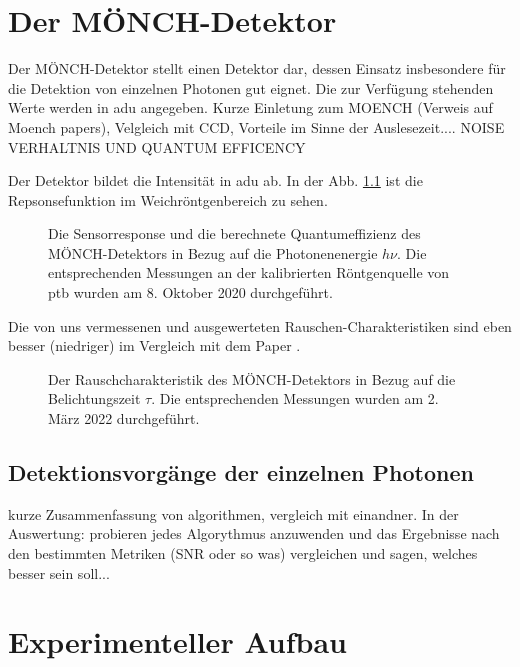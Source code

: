 \chapter{Der MÖNCH-Detektor}
\label{text:moench_theorie}
Der MÖNCH-Detektor stellt einen Detektor dar, dessen Einsatz insbesondere für die Detektion von einzelnen Photonen gut eignet. Die zur Verfügung stehenden Werte werden in \gls{adu} angegeben. \cite{bergamaschi_monch_2018}
Kurze Einletung zum MOENCH (Verweis auf Moench papers), Velgleich mit CCD, Vorteile 
im Sinne der Auslesezeit.... NOISE VERHALTNIS  UND QUANTUM EFFICENCY

Der Detektor bildet die Intensität in \gls{adu} ab. In der Abb. \ref{fig:response_moench} ist die Repsonsefunktion im Weichröntgenbereich zu sehen. 
\begin{figure}[H]
    \centering
    
    \caption{Die Sensorresponse und die berechnete Quantumeffizienz des MÖNCH-Detektors in Bezug auf die Photonenenergie $h\nu$. Die entsprechenden Messungen an der kalibrierten Röntgenquelle von \gls{ptb} wurden am 8. Oktober 2020 durchgeführt.}
    \label{fig:response_moench}
\end{figure}
Die von uns vermessenen und ausgewerteten Rauschen-Charakteristiken sind eben besser (niedriger) im Vergleich mit dem Paper \cite{ramilli_measurements_2017}.
\begin{figure}[H]
    \centering
    
    \caption{Der Rauschcharakteristik des MÖNCH-Detektors in Bezug auf die Belichtungszeit $\tau$. Die entsprechenden Messungen wurden am 2. März 2022 durchgeführt.}
    \label{fig:noise_moench}
\end{figure}
\section{Detektionsvorgänge der einzelnen Photonen}
\label{text:single_photon_theorie}
kurze Zusammenfassung von algorithmen, vergleich mit einandner. In der Auswertung: probieren jedes Algorythmus anzuwenden und das Ergebnisse nach den bestimmten Metriken (SNR oder so was) vergleichen und sagen, welches besser sein soll...

\chapter{Experimenteller Aufbau}
